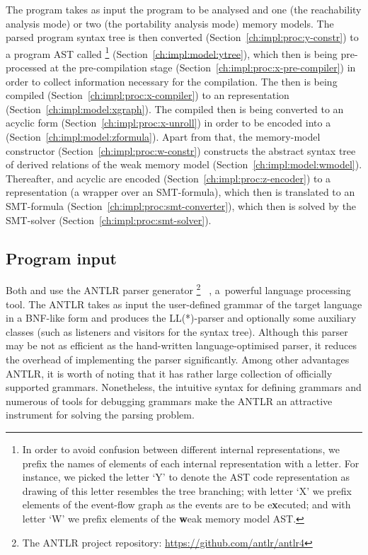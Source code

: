 The program takes as input the program to be analysed and one (the reachability analysis mode) or two (the portability analysis mode) memory models.
The parsed program syntax tree is then converted (Section~\ref{ch:impl:proc:y-constr}) to a program AST called \ytree{}%
\footnote{In order to avoid confusion between different internal representations, we prefix the names of elements of each internal representation with a letter. For instance, we picked the letter `Y' to denote the AST code representation as drawing of this letter resembles the tree branching; with letter `X' we prefix elements of the event-flow graph as the events are to be e\textbf{x}ecuted; and with letter `W' we prefix elements of the \textbf{w}eak memory model AST.}%
(Section~\ref{ch:impl:model:ytree}), which then is being pre-processed at the pre-compilation stage (Section~\ref{ch:impl:proc:x-pre-compiler}) in order to collect information necessary for the compilation.
The \ytree{} then is being compiled (Section~\ref{ch:impl:proc:x-compiler}) to an \xgraph{} representation (Section~\ref{ch:impl:model:xgraph}).
The compiled \xgraph{} then is being converted to an acyclic form (Section~\ref{ch:impl:proc:x-unroll}) in order to be encoded into a \zformula{} (Section~\ref{ch:impl:model:zformula}).
Apart from that, the memory-model constructor (Section~\ref{ch:impl:proc:w-constr}) constructs the abstract syntax tree of derived relations of the weak memory model \wmodel{} (Section~\ref{ch:impl:model:wmodel}).
Thereafter, \wmodel{} and acyclic \xgraph{} are encoded (Section~\ref{ch:impl:proc:z-encoder}) to a \zformula{} representation (a wrapper over an SMT-formula), which then is translated to an SMT-formula (Section~\ref{ch:impl:proc:smt-converter}), which then is solved by the SMT-solver (Section~\ref{ch:impl:proc:smt-solver}).

\subsection{Program input}
\label{ch:impl:input}

Both \porthos[1] and \porthos[2] use the ANTLR parser generator%
\footnote{The ANTLR project repository: \url{https://github.com/antlr/antlr4}}%
~\cite{parr2013definitive}, a~powerful language processing tool.
The ANTLR takes as input the user-defined grammar of the target language in a BNF-like form and produces the LL(*)-parser and optionally some auxiliary classes (such as listeners and visitors for the syntax tree).
Although this parser may be not as efficient as the hand-written language-optimised parser, it reduces the overhead of implementing the parser significantly.
Among other advantages ANTLR, it is worth of noting that it has rather large collection of officially supported grammars. Nonetheless, the intuitive syntax for defining grammars and numerous of tools for debugging grammars make the ANTLR an attractive instrument for solving the parsing problem.

